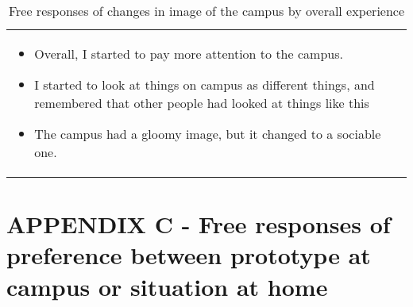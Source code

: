 \begin{table}[h]
    \begin{center}
      \caption{Free responses of changes in image of the campus by overall experience}\label{table:12}
      \begin{tabular}{L{\textwidth}}
        \hline
           \\
        \hline
          {
            \begin{itemize}
              \item Overall, I started to pay more attention to the campus.
              \item I started to look at things on campus as different things, and remembered that other people had looked at things like this
              \item The campus had a gloomy image, but it changed to a sociable one.
            \end{itemize}
          } \\
        \hline
    \end{tabular}
\end{center} 
\end{table}

\chapter*{APPENDIX C - Free responses of preference between prototype at campus or situation at home}

